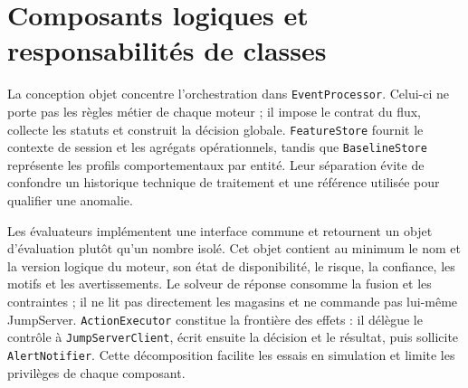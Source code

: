 \documentclass[11pt,a4paper,oneside]{report}
\theoremstyle{definition}
\theoremstyle{plain}
\begin{document}
\section{Composants logiques et responsabilités de classes}

La conception objet concentre l'orchestration dans \texttt{EventProcessor}.
Celui-ci ne porte pas les règles métier de chaque moteur ; il impose le contrat
du flux, collecte les statuts et construit la décision globale.
\texttt{FeatureStore} fournit le contexte de session et les agrégats
opérationnels, tandis que \texttt{BaselineStore} représente les profils
comportementaux par entité. Leur séparation évite de confondre un historique
technique de traitement et une référence utilisée pour qualifier une anomalie.

Les évaluateurs implémentent une interface commune et retournent un objet
d'évaluation plutôt qu'un nombre isolé. Cet objet contient au minimum le nom et
la version logique du moteur, son état de disponibilité, le risque, la
confiance, les motifs et les avertissements. Le solveur de réponse consomme la
fusion et les contraintes ; il ne lit pas directement les magasins et ne
commande pas lui-même JumpServer. \texttt{ActionExecutor} constitue la frontière
des effets : il délègue le contrôle à \texttt{JumpServerClient}, écrit ensuite
la décision et le résultat, puis sollicite \texttt{AlertNotifier}. Cette
décomposition facilite les essais en simulation et limite les privilèges de
chaque composant.
\end{document}
